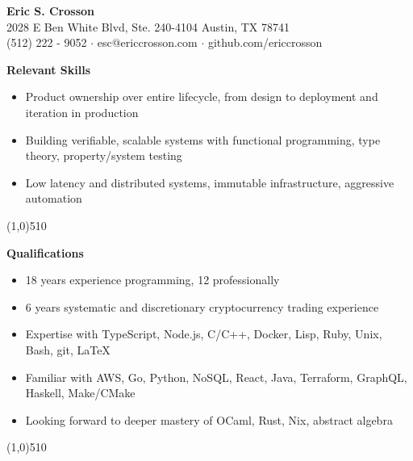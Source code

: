 \documentclass{report}
\newcommand{\cut}{\begin{center} \line(1,0){510} \end{center}}
\begin{document}
\pagestyle{empty}
\setlength\parindent{0pt}

\begin{center}
  \textbf{Eric S. Crosson} \\
  2028 E Ben White Blvd, Ste. 240-4104 Austin, TX 78741 \\
  (512) 222 - 9052 $\cdot$ esc@ericcrosson.com $\cdot$ github.com/ericcrosson
\end{center}

%

\textbf{Relevant Skills}
\begin{itemize}[label=$\cdot$]
\item Product ownership over entire lifecycle, from design to deployment and iteration in production
\item Building verifiable, scalable systems with functional programming, type theory, property/system testing
\item Low latency and distributed systems, immutable infrastructure, aggressive automation
\end{itemize}

\cut{}

\textbf{Qualifications}
\begin{itemize}[label=$\cdot$]
\item 18 years experience programming, 12 professionally
\item 6 years systematic and discretionary cryptocurrency trading experience
\item Expertise with TypeScript, Node.js, C/C++, Docker, Lisp, Ruby, Unix, Bash, git, \LaTeX{}
\item Familiar with AWS, Go, Python, NoSQL, React, Java, Terraform, GraphQL, Haskell, Make/CMake
\item Looking forward to deeper mastery of OCaml, Rust, Nix, abstract algebra
\end{itemize}

\cut{}
\end{document}
